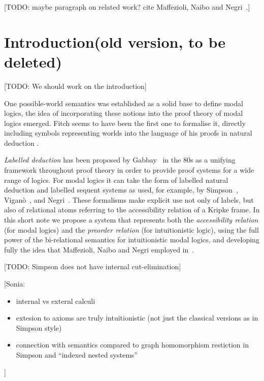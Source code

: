\documentclass[a4paper]{article}
\theoremstyle{plain}
\theoremstyle{definition}
\newcommand{\sonia}[1]{{\color{blue}[Sonia: #1]}}
\newcommand{\todo}[1]{{\color{red}[TODO: #1]}}
\begin{document}
\todo{maybe paragraph on related work? cite Maffezioli, Naibo and Negri~\cite{Maffezioli}.}


\section*{Introduction(old version, to be deleted)}
\todo{We should work on the introduction}

One possible-world semantics was established as a solid base to define modal logics, the idea of incorporating these notions into the proof theory of modal logics emerged. Fitch seems to have been the first one to formalise it, directly including symbols representing worlds into the language of his proofs in natural deduction \cite{Fitch}.

\emph{Labelled deduction} has been proposed by Gabbay~\cite{Gabbay} in the 80s as a unifying framework throughout proof theory in order to provide proof
systems for a wide range of logics. 
%
For modal logics it can take
the form of labelled natural deduction and labelled sequent systems as
used, for example, by Simpson~\cite{Simpson}, Vigan\`o~\cite{Vigano}, and
Negri~\cite{Negri}. 
%
These formalisms make explicit use not only of
labels, but also of relational atoms referring to the accessibility relation of a Kripke frame.
%
In this short note we propose a system that represents both the \emph{accessibility relation} (for modal
logics) and the \emph{preorder relation} (for intuitionistic
logic), using the full power of the bi-relational semantics for
intuitionistic modal logics,
and developing fully the idea that Maffezioli, Naibo and Negri employed in~\cite{Maffezioli}. 

\todo{Simpson does not have internal cut-elimination}

\sonia{
  \begin{itemize}
  \item internal vs externl calculi
  \item extesion to axioms are truly intuitionistic (not just the
    classical versions as in Simpson style)
  \item connection with semantics compared to graph homomorphism
    restiction in Simpson and ``indexed nested systems''
  \end{itemize}
}
  
\end{document}
